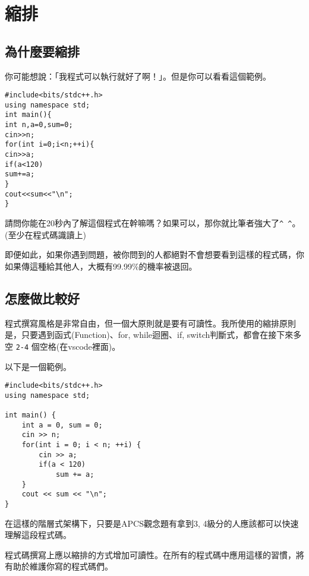 \section{縮排}
    \subsection{為什麼要縮排}
    你可能想說：「我程式可以執行就好了啊！」。但是你可以看看這個範例。

    \begin{lstlisting}[caption=縮排的錯誤示範]
#include<bits/stdc++.h>
using namespace std;
int main(){
int n,a=0,sum=0;
cin>>n;
for(int i=0;i<n;++i){
cin>>a;
if(a<120)
sum+=a;
}
cout<<sum<<"\n";
}\end{lstlisting}

    請問你能在20秒內了解這個程式在幹嘛嗎？如果可以，那你就比筆者強大了\verb|^ ^|。(至少在程式碼識讀上)

    即便如此，如果你遇到問題，被你問到的人都絕對不會想要看到這樣的程式碼，你如果傳這種給其他人，大概有99.99\%的機率被退回。

    \subsection{怎麼做比較好}
    程式撰寫風格是非常自由，但一個大原則就是要有可讀性。我所使用的縮排原則是，只要遇到函式(Function)、for, while迴圈、if, switch判斷式，都會在接下來多空 \verb|2-4| 個空格(在vscode裡面)。
    
    以下是一個範例。

    \begin{lstlisting}[caption=縮排的合理示例]
#include<bits/stdc++.h>
using namespace std;

int main() {
    int a = 0, sum = 0;
    cin >> n;
    for(int i = 0; i < n; ++i) {
        cin >> a;
        if(a < 120)
            sum += a;
    }
    cout << sum << "\n";
}\end{lstlisting}

    在這樣的階層式架構下，只要是APCS觀念題有拿到3, 4級分的人應該都可以快速理解這段程式碼。

    \begin{tip}
    程式碼撰寫上應以縮排的方式增加可讀性。在所有的程式碼中應用這樣的習慣，將有助於維護你寫的程式碼們。
    \end{tip}